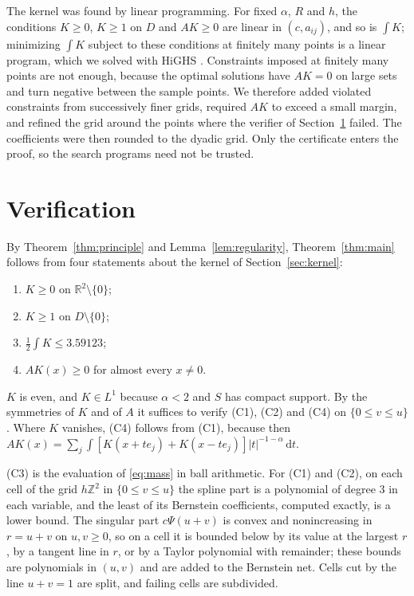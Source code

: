\documentclass[11pt]{amsart}
\theoremstyle{definition}
\theoremstyle{remark}
\numberwithin{equation}{section}
\newcommand{\R}{\mathbb{R}}
\newcommand{\Z}{\mathbb{Z}}
\newcommand{\dd}{\,\mathrm{d}}
\newcommand{\CBOUND}{3.59123}
\begin{document}
The kernel was found by linear programming. For fixed $\alpha$, $R$ and $h$, the conditions $K\ge0$, $K\ge1$ on $D$ and $AK\ge0$ are linear in $(c,a_{ij})$, and so is $\int K$; minimizing $\int K$ subject to these conditions at finitely many points is a linear program, which we solved with HiGHS \cite{HiGHS}. Constraints imposed at finitely many points are not enough, because the optimal solutions have $AK=0$ on large sets and turn negative between the sample points. We therefore added violated constraints from successively finer grids, required $AK$ to exceed a small margin, and refined the grid around the points where the verifier of Section~\ref{sec:verify} failed. The coefficients were then rounded to the dyadic grid. Only the certificate enters the proof, so the search programs need not be trusted.

\section{Verification}\label{sec:verify}

By Theorem~\ref{thm:principle} and Lemma~\ref{lem:regularity}, Theorem~\ref{thm:main} follows from four statements about the kernel of Section~\ref{sec:kernel}:
\begin{enumerate}[label=(C\arabic*)]
\item $K\ge0$ on $\R^2\setminus\{0\}$;
\item $K\ge1$ on $D\setminus\{0\}$;
\item $\frac12\int K\le\CBOUND$;
\item $AK(x)\ge0$ for almost every $x\ne0$.
\end{enumerate}
$K$ is even, and $K\in L^1$ because $\alpha<2$ and $S$ has compact support. By the symmetries of $K$ and of $A$ it suffices to verify (C1), (C2) and (C4) on $\{0\le v\le u\}$. Where $K$ vanishes, (C4) follows from (C1), because then $AK(x)=\sum_j\int[K(x+te_j)+K(x-te_j)]|t|^{-1-\alpha}\dd t$.

(C3) is the evaluation of \eqref{eq:mass} in ball arithmetic. For (C1) and (C2), on each cell of the grid $h\Z^2$ in $\{0\le v\le u\}$ the spline part is a polynomial of degree $3$ in each variable, and the least of its Bernstein coefficients, computed exactly, is a lower bound. The singular part $c\Psi(u+v)$ is convex and nonincreasing in $r=u+v$ on $u,v\ge0$, so on a cell it is bounded below by its value at the largest $r$, by a tangent line in $r$, or by a Taylor polynomial with remainder; these bounds are polynomials in $(u,v)$ and are added to the Bernstein net. Cells cut by the line $u+v=1$ are split, and failing cells are subdivided.
\end{document}
